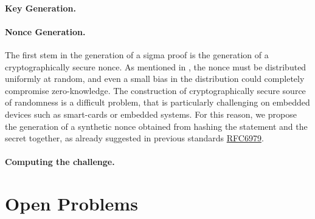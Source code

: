 \documentclass[runningheads]{llncs}
\begin{document}
\paragraph{Key Generation.}

\paragraph{Nonce Generation.} The first stem in the generation of a sigma proof is the generation of a cryptographically secure nonce. As mentioned in , the nonce must be distributed uniformly at random, and even a small bias in the distribution could completely compromise zero-knowledge.
The construction of cryptographically secure source of randomness is a difficult problem, that is particularly challenging on embedded devices such as smart-cards or embedded systems.
For this reason, we propose the generation of a synthetic nonce obtained from hashing the statement and the secret together, as already suggested in previous standards \href{https://tools.ietf.org/html/rfc6979}{RFC6979}.


\paragraph{Computing the challenge.}

\section{Open Problems}


%
\end{document}
